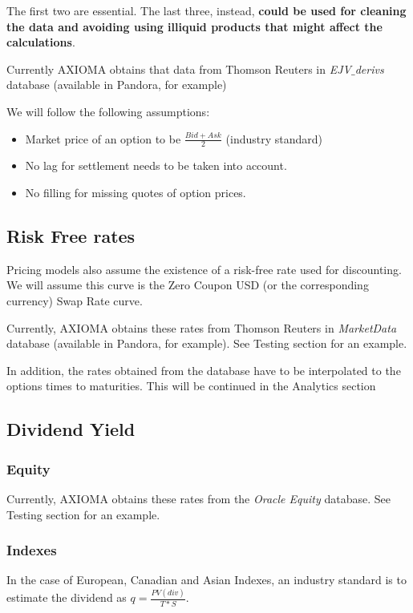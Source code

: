 \documentclass[11pt,confidential]{article}
\begin{document}
The first two are essential. The last three, instead, \textbf{could be used for cleaning the data and avoiding using illiquid products that might affect the calculations}.

Currently AXIOMA obtains that data from Thomson Reuters in \textit{EJV$\_$derivs} database (available in Pandora, for example)

We will follow the following assumptions:
\begin{itemize}
\item Market price of an option to be $\frac{Bid+Ask}{2}$ (industry standard)
\item No lag for settlement needs to be taken into account. 
\item No filling for missing quotes of option prices.
\end{itemize}


\subsection{Risk Free rates}

Pricing models also assume the existence of a risk-free rate used for discounting. We will assume this curve is the Zero Coupon USD (or the corresponding currency) Swap Rate curve.

Currently, AXIOMA obtains these rates from Thomson Reuters in \textit{MarketData} database (available in Pandora, for example). See Testing section for an example.

In addition, the rates obtained from the database have to be interpolated to the options times to maturities. This will be continued in the Analytics section


\subsection{Dividend Yield}

\subsubsection{Equity}

Currently, AXIOMA obtains these rates from the \textit{Oracle Equity} database. See Testing section for an example. 

\subsubsection{Indexes}

 
In the case of European, Canadian and Asian Indexes, an industry standard is to estimate the dividend as $q = \frac{PV(div)}{T*S}$. 
\end{document}
